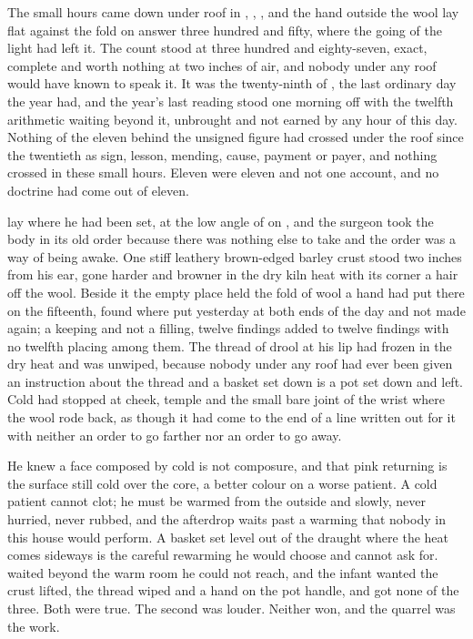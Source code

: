 
The small hours came down under  roof in , , , and the hand outside the wool lay flat against the fold on answer three hundred and fifty, where the going of the light had left it. The count stood at three hundred and eighty-seven, exact, complete and worth nothing at two inches of air, and nobody under any roof would have known to speak it. It was the twenty-ninth of , the last ordinary day the year had, and the year's last reading stood one morning off with the twelfth arithmetic waiting beyond it, unbrought and not earned by any hour of this day. Nothing of the eleven behind the unsigned figure had crossed under the roof since the twentieth as sign, lesson, mending, cause, payment or payer, and nothing crossed in these small hours. Eleven were eleven and not one account, and no doctrine had come out of eleven.

 lay where he had been set, at the low angle of  on , and the surgeon took the body in its old order because there was nothing else to take and the order was a way of being awake. One stiff leathery brown-edged barley crust stood two inches from his ear, gone harder and browner in the dry kiln heat with its corner a hair off the wool. Beside it the empty place held the fold of wool a hand had put there on the fifteenth, found where put yesterday at both ends of the day and not made again; a keeping and not a filling, twelve findings added to twelve findings with no twelfth placing among them. The thread of drool at his lip had frozen in the dry heat and was unwiped, because nobody under any roof had ever been given an instruction about the thread and a basket set down is a pot set down and left. Cold had stopped at cheek, temple and the small bare joint of the wrist where the wool rode back, as though it had come to the end of a line written out for it with neither an order to go farther nor an order to go away.

He knew a face composed by cold is not composure, and that pink returning is the surface still cold over the core, a better colour on a worse patient. A cold patient cannot clot; he must be warmed from the outside and slowly, never hurried, never rubbed, and the afterdrop waits past a warming that nobody in this house would perform. A basket set level out of the draught where the heat comes sideways is the careful rewarming he would choose and cannot ask for.  waited beyond the warm room he could not reach, and the infant wanted the crust lifted, the thread wiped and a hand on the pot handle, and got none of the three. Both were true. The second was louder. Neither won, and the quarrel was the work.

